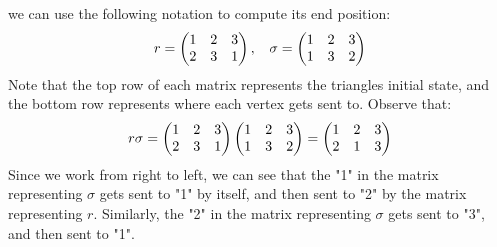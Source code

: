 \begin{example}
\begin{center}
\begin{tikzpicture}[scale=1, every node/.style={circle, draw, inner sep=1pt, fill=gray!30, text=black}]
                    \end{tikzpicture}
            \end{center}
        we can use the following notation to compute its end position:
            \begin{equation*}
            \begin{split}
                r = \bmat 1 & 2 & 3 \\ 2 & 3 & 1 \emat, \h9 \sigma = \bmat 1 & 2 & 3 \\ 1 & 3 & 2 \emat
            \end{split}
            \end{equation*}
        Note that the top row of each matrix represents the triangles initial state, and the bottom row represents where each vertex gets sent to. Observe that:
            \begin{equation*}
            \begin{split}
                r \sigma = \bmat 1 & 2 & 3 \\ 2 & 3 & 1 \emat \bmat 1 & 2 & 3 \\ 1 & 3 & 2 \emat = \bmat 1 & 2 & 3 \\ 2 & 1 & 3 \emat
            \end{split}
            \end{equation*}
        Since we work from right to left, we can see that the "1" in the matrix representing $\sigma$ gets sent to "1" by itself, and then sent to "2" by the matrix representing $r$. Similarly, the "2" in the matrix representing $\sigma$ gets sent to "3", and then sent to "1".


\end{example}
